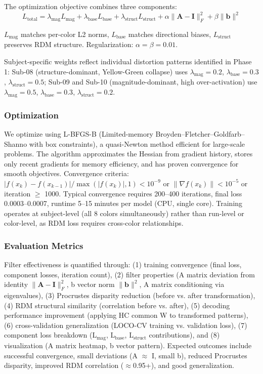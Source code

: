 \documentclass[12pt,a4paper]{article}
\begin{document}
The optimization objective combines three components:
\begin{equation}
L_{\text{total}} = \lambda_{\text{mag}} L_{\text{mag}} + \lambda_{\text{base}} L_{\text{base}} + \lambda_{\text{struct}} L_{\text{struct}} + \alpha \|\mathbf{A} - \mathbf{I}\|_F^2 + \beta \|\mathbf{b}\|^2
\label{eq:loss}
\end{equation}

$L_{\text{mag}}$ matches per-color L2 norms, $L_{\text{base}}$ matches directional biases, $L_{\text{struct}}$ preserves RDM structure. Regularization: $\alpha = \beta = 0.01$.

Subject-specific weights reflect individual distortion patterns identified in Phase 1: Sub-08 (structure-dominant, Yellow-Green collapse) uses $\lambda_{\text{mag}}=0.2$, $\lambda_{\text{base}}=0.3$, $\lambda_{\text{struct}}=0.5$; Sub-09 and Sub-10 (magnitude-dominant, high over-activation) use $\lambda_{\text{mag}}=0.5$, $\lambda_{\text{base}}=0.3$, $\lambda_{\text{struct}}=0.2$.

\subsubsection{Optimization}

We optimize using L-BFGS-B (Limited-memory Broyden–Fletcher–Goldfarb–Shanno with box constraints), a quasi-Newton method efficient for large-scale problems. The algorithm approximates the Hessian from gradient history, stores only recent gradients for memory efficiency, and has proven convergence for smooth objectives. Convergence criteria: $|f(x_k) - f(x_{k-1})| / \max(|f(x_k)|, 1) < 10^{-9}$ or $\|\nabla f(x_k)\| < 10^{-5}$ or iteration $\geq$ 1000. Typical convergence requires 200--400 iterations, final loss 0.0003--0.0007, runtime 5--15 minutes per model (CPU, single core). Training operates at subject-level (all 8 colors simultaneously) rather than run-level or color-level, as RDM loss requires cross-color relationships.

\subsubsection{Evaluation Metrics}

Filter effectiveness is quantified through: (1) training convergence (final loss, component losses, iteration count), (2) filter properties (A matrix deviation from identity $\|\mathbf{A} - \mathbf{I}\|_F^2$, b vector norm $\|\mathbf{b}\|^2$, A matrix conditioning via eigenvalues), (3) Procrustes disparity reduction (before vs. after transformation), (4) RDM structural similarity (correlation before vs. after), (5) decoding performance improvement (applying HC common W to transformed patterns), (6) cross-validation generalization (LOCO-CV training vs. validation loss), (7) component loss breakdown (L$_{\text{mag}}$, L$_{\text{base}}$, L$_{\text{struct}}$ contributions), and (8) visualization (A matrix heatmap, b vector pattern). Expected outcomes include successful convergence, small deviations (A $\approx$ I, small b), reduced Procrustes disparity, improved RDM correlation ($\approx$0.95+), and good generalization.
\end{document}

